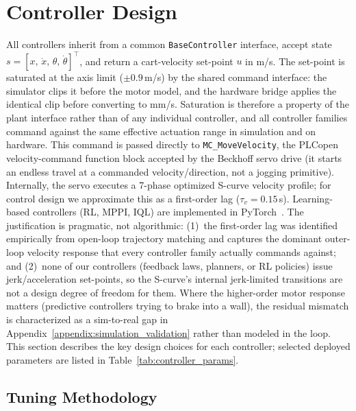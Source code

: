 \section{Controller Design}
\label{appendix:implementation}

All controllers inherit from a common \texttt{BaseController} interface,
accept state $s = [x,\,\dot{x},\,\theta,\,\dot{\theta}]^\top$, and
return a cart-velocity set-point $u$ in m/s. The set-point is
saturated at the axis limit ($\pm 0.9$\,m/s) by the shared command
interface: the simulator clips it before the motor model, and the
hardware bridge applies the identical clip before converting to mm/s.
Saturation is therefore a property of the plant interface rather than
of any individual controller, and all controller families command
against the same effective actuation range in simulation and on
hardware.
This command is passed directly to \texttt{MC\_MoveVelocity}, the
PLCopen velocity-command function block accepted by the Beckhoff servo
drive (it starts an endless travel at a commanded velocity/direction,
not a jogging primitive). Internally, the
servo executes a 7-phase optimized S-curve velocity profile; for control
design we approximate this as a first-order lag ($\tau_v = 0.15$\,s).
Learning-based controllers (RL, MPPI, IQL) are implemented in
PyTorch~\cite{paszke2019pytorch}.
The justification is pragmatic, not algorithmic: (1)~the first-order
lag was identified empirically from open-loop trajectory matching and
captures the dominant outer-loop velocity response that every controller
family actually commands against; and (2)~none of our controllers
(feedback laws, planners, or RL policies) issue jerk/acceleration
set-points, so the S-curve's internal jerk-limited transitions are not a
design degree of freedom for them. Where the higher-order motor
response matters (predictive controllers trying to brake into a wall),
the residual mismatch is characterized as a sim-to-real gap in
Appendix~\ref{appendix:simulation_validation} rather than modeled in
the loop.
This section describes the key design choices for each controller;
selected deployed parameters are listed in Table~\ref{tab:controller_params}.

\subsection{Tuning Methodology}
\label{sec:tuning}

